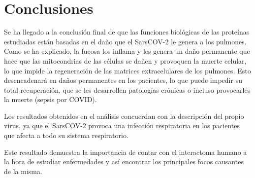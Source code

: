 \section{Conclusiones}

Se ha llegado a la conclusión final de que las funciones biológicas de las proteínas estudiadas están basadas en el daño que el SarsCOV-2 le genera a los pulmones. 
Como se ha explicado, la fucosa los inflama y les genera un daño permanente que hace que las mitocondrias de las células se dañen y provoquen la muerte celular, lo que impide la regeneración de las matrices extracelulares de los pulmones.
Esto desencadenará en daños permanentes en los pacientes, lo que puede impedir su total recuperación, que se les desarrollen patologías crónicas o incluso provocarles la muerte (sepsis por COVID).

Los resultados obtenidos en el análisis concuerdan con la descripción del propio virus, ya que el SarsCOV-2 provoca una infección respiratoria en los pacientes que afecta a todo su sistema respiratorio. 

Este resultado demuestra la importancia de contar con el interactoma humano a la hora de estudiar enfermedades y así encontrar los principales focos causantes de la misma.